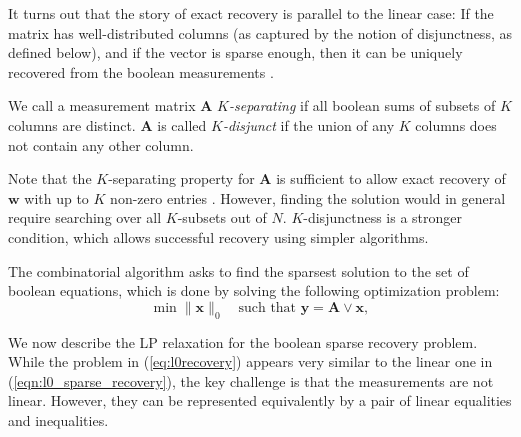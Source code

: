 It turns out that the story of exact recovery is parallel to the linear case:
If the matrix has well-distributed columns (as captured by the notion of disjunctness, as 
defined below), and if the vector is sparse enough, then it can be uniquely recovered from the
boolean measurements \cite{group_testing}.

\begin{definition}
We call a measurement matrix $\mathbf{A}$ {\em $K$-separating}
if all boolean sums of subsets of $K$ columns are distinct.
$\mathbf{A}$ is called {\em $K$-disjunct} if the union of any
$K$ columns does not contain any other column.
\end{definition}

Note that the $K$-separating property for $\mathbf{A}$ is sufficient
to allow exact recovery of $\mathbf{w}$ with up to $K$ non-zero entries
\cite{book2_group_testing}. However, finding the solution would
in general require searching over all $K$-subsets out of $N$. $K$-disjunctness
is a stronger condition, which allows successful recovery using simpler algorithms.

The combinatorial algorithm asks to find the sparsest solution to the
set of boolean equations, which is done by solving the following optimization problem:
\begin{equation}
\label{eq:l0recovery}
	\min \|\mathbf{x}\|_0 \quad {\textrm{such that }}\mathbf{y} = \mathbf{A} \lor \mathbf{x},
\end{equation}

We now describe the LP relaxation for the boolean sparse recovery problem. While
the problem in (\ref{eq:l0recovery}) appears very similar to the linear one in
(\ref{eqn:l0_sparse_recovery}), the key challenge is that the measurements are not linear. However, they can be represented equivalently by a pair of linear equalities and inequalities.

